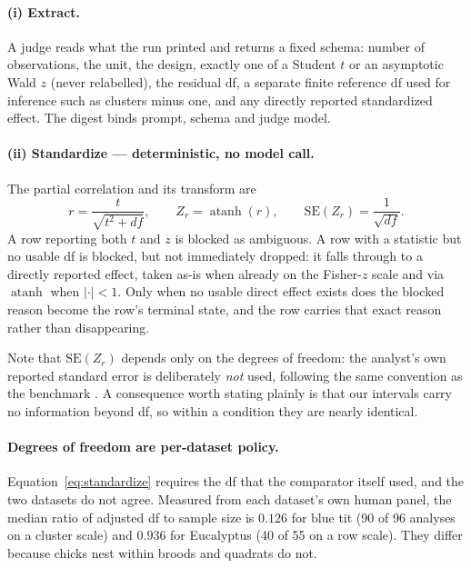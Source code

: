 \documentclass{article}
\begin{document}
\paragraph{(i) Extract.}
A judge reads what the run printed and returns a fixed schema: number of
observations, the unit, the design, exactly one of a Student $t$ or an
asymptotic Wald $z$ (never relabelled), the residual df, a separate finite
reference df used for inference such as clusters minus one, and any directly
reported standardized effect. The digest binds prompt, schema and judge model.

\paragraph{(ii) Standardize --- deterministic, no model call.}
The partial correlation and its transform are
\begin{equation}
r = \frac{t}{\sqrt{t^{2} + \mathit{df}}},
\qquad
Z_r = \operatorname{atanh}(r),
\qquad
\mathrm{SE}(Z_r) = \frac{1}{\sqrt{\mathit{df}}} .
\label{eq:standardize}
\end{equation}
A row reporting both $t$ and $z$ is blocked as ambiguous. A row with a statistic
but no usable df is blocked, but not immediately dropped: it falls through to a
directly reported effect, taken as-is when already on the Fisher-$z$ scale and
via $\operatorname{atanh}$ when $|{\cdot}| < 1$. Only when no usable direct
effect exists does the blocked reason become the row's terminal state, and the
row carries that exact reason rather than disappearing.

Note that $\mathrm{SE}(Z_r)$ depends only on the degrees of freedom: the
analyst's own reported standard error is deliberately \emph{not} used, following
the same convention as the benchmark \cite{gould2025same}. A consequence worth
stating plainly is that our intervals carry no information beyond df, so within
a condition they are nearly identical.

\paragraph{Degrees of freedom are per-dataset policy.}
Equation~\ref{eq:standardize} requires the df that the comparator itself used,
and the two datasets do not agree. Measured from each dataset's own human
panel, the median ratio of adjusted df to sample size is $0.126$ for blue tit
(90 of 96 analyses on a cluster scale) and $0.936$ for Eucalyptus (40 of 55 on a
row scale). They differ because chicks nest within broods and quadrats do not.
\end{document}
